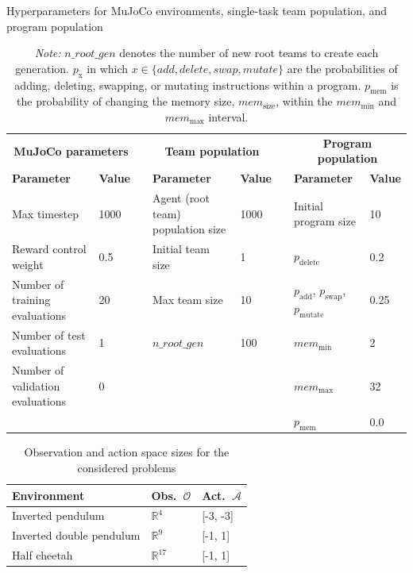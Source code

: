 \documentclass[sigconf]{acmart}
\begin{document}
\begin{table}
  \caption{Hyperparameters for MuJoCo environments, single-task team population, and program population}\label{tab:hyperparameters}
  \centering
  \begin{tabular}{llcllcll}
    \toprule
    \multicolumn{2}{c}{\textbf{MuJoCo parameters}} & & \multicolumn{2}{c}{\textbf{Team population}} & & \multicolumn{2}{c}{\textbf{Program population}} \\
    \cmidrule(r){1-2} \cmidrule(lr){4-5} \cmidrule(l){7-8}
    \textbf{Parameter} & \textbf{Value} & & \textbf{Parameter} & \textbf{Value} & & \textbf{Parameter} & \textbf{Value} \\
    \midrule
    Max timestep & 1000 & & Agent (root team) population size & 1000 & & Initial program size & 10 \\
    Reward control weight & 0.5 & & Initial team size & 1 & & $p_\text{delete}$ & 0.2 \\
    Number of training evaluations & 20 & & Max team size & 10 & & $p_\text{add}$, $p_\text{swap}$, $p_\text{mutate}$ & 0.25 \\
    Number of test evaluations & 1 & & $n\_root\_gen$ & 100 & & $mem_\text{min}$ & 2 \\
    Number of validation evaluations & 0 & & & & & $mem_\text{max}$ & 32 \\
    & & & & & & $p_\text{mem}$ & 0.0 \\
    \bottomrule
  \end{tabular}
  \caption*{\small \textit{Note:} $n\_root\_gen$ denotes the number of new root teams to create each generation. $p_\text{x}$ in which $x \in \{add, delete, swap, mutate\}$ are the probabilities of adding, deleting, swapping, or mutating instructions within a program. $p_\text{mem}$ is the probability of changing the memory size, $mem_\text{size}$, within the $mem_\text{min}$ and $mem_\text{max}$ interval.}
\end{table}

\begin{table}
  \caption{Observation and action space sizes for the considered problems \cite{FaramaFoundation24}}\label{tab:observation_space}
  \begin{tabular}{lll}
    \toprule
    \textbf{Environment}&\textbf{Obs.}~$\mathcal{O}$&\textbf{Act.}~$\mathcal{A}$\\
    \midrule
    Inverted pendulum & $\mathbb{R}^4$ & [-3, -3]\\
    Inverted double pendulum & $\mathbb{R}^9$ & [-1, 1]\\
    Half cheetah & $\mathbb{R}^{17}$ & [-1, 1]\\
  \bottomrule
\end{tabular}
\end{table}
\end{document}
